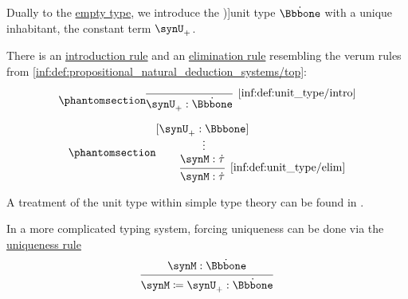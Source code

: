 \begin{definition}\label{def:unit_type}\mimprovised
  Dually to the \hyperref[def:empty_type]{empty type}, we introduce the \term[en=unit type (\cite[\S 4.3.4]{Mimram2020ProgramEqualsProof})]{unit type} \( \syn\Bbbone \) with a unique inhabitant, the constant term \( \synU_+ \).

  There is an \hyperref[rem:type_theory_rule_classification/introduction]{introduction rule} and an \hyperref[rem:type_theory_rule_classification/introduction]{elimination rule} resembling the verum rules from \ref{inf:def:propositional_natural_deduction_systems/top}:
  \begin{paracol}{2}
    \begin{leftcolumn}
      \ParacolAlignmentHack
      \begin{equation*}\taglabel[\ensuremath{ \Bbbone_+ }]{inf:def:unit_type/intro}
        \begin{prooftree}
          \infer0[\ref{inf:def:unit_type/intro}]{ \synU_+: \syn\Bbbone }
        \end{prooftree}
      \end{equation*}
    \end{leftcolumn}

    \begin{rightcolumn}
      \ParacolAlignmentHack
      \begin{equation*}\taglabel[\ensuremath{ \Bbbone_- }]{inf:def:unit_type/elim}
        \begin{prooftree}
          \hypo{ [\synU_+: \Bbbone] }
          \ellipsis {} { \synM: \syn\tau }
          \infer1[\ref{inf:def:unit_type/elim}]{ \synM: \syn\tau }
        \end{prooftree}
      \end{equation*}
    \end{rightcolumn}
  \end{paracol}
\end{definition}
\begin{comments}
  \item A treatment of the unit type within simple type theory can be found in \cite[\S 4.3.2]{Mimram2020ProgramEqualsProof}.

  \item In a more complicated typing system, forcing uniqueness can be done via the \hyperref[rem:type_theory_rule_classification/equality/uniqueness]{uniqueness rule}
  \begin{equation*}
    \begin{prooftree}
      \hypo{ \synM: \syn\Bbbone }
      \infer1{ \synM \coloneqq \synU_+: \syn\Bbbone }
    \end{prooftree}
  \end{equation*}
\end{comments}

